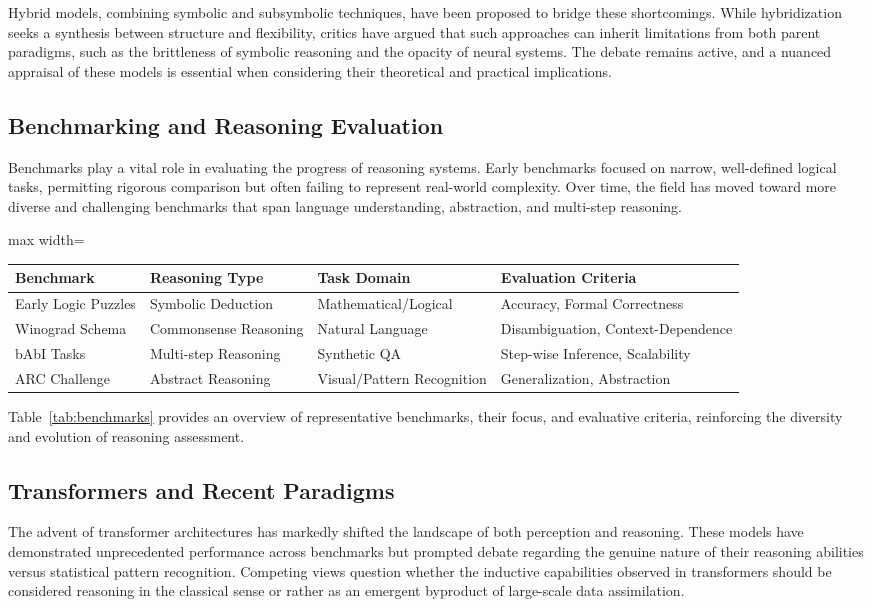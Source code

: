 \documentclass[sigconf]{acmart}
\begin{document}
Hybrid models, combining symbolic and subsymbolic techniques, have been proposed to bridge these shortcomings. While hybridization seeks a synthesis between structure and flexibility, critics have argued that such approaches can inherit limitations from both parent paradigms, such as the brittleness of symbolic reasoning and the opacity of neural systems. The debate remains active, and a nuanced appraisal of these models is essential when considering their theoretical and practical implications.

\subsection{Benchmarking and Reasoning Evaluation}
Benchmarks play a vital role in evaluating the progress of reasoning systems. Early benchmarks focused on narrow, well-defined logical tasks, permitting rigorous comparison but often failing to represent real-world complexity. Over time, the field has moved toward more diverse and challenging benchmarks that span language understanding, abstraction, and multi-step reasoning.

\begin{table*}[htbp]
\centering
\caption{Key Benchmarks in AI Reasoning and Their Evaluative Focus}
\label{tab:benchmarks}
\begin{adjustbox}{max width=\textwidth}
\begin{tabular}{@{}llll@{}}
\toprule
Benchmark & Reasoning Type & Task Domain & Evaluation Criteria \\
\midrule
Early Logic Puzzles & Symbolic Deduction & Mathematical/Logical & Accuracy, Formal Correctness \\
Winograd Schema & Commonsense Reasoning & Natural Language & Disambiguation, Context-Dependence \\
bAbI Tasks & Multi-step Reasoning & Synthetic QA & Step-wise Inference, Scalability \\
ARC Challenge & Abstract Reasoning & Visual/Pattern Recognition & Generalization, Abstraction \\
\bottomrule
\end{tabular}
\end{adjustbox}
\end{table*}

Table~\ref{tab:benchmarks} provides an overview of representative benchmarks, their focus, and evaluative criteria, reinforcing the diversity and evolution of reasoning assessment.

\subsection{Transformers and Recent Paradigms}
The advent of transformer architectures has markedly shifted the landscape of both perception and reasoning. These models have demonstrated unprecedented performance across benchmarks but prompted debate regarding the genuine nature of their reasoning abilities versus statistical pattern recognition. Competing views question whether the inductive capabilities observed in transformers should be considered reasoning in the classical sense or rather as an emergent byproduct of large-scale data assimilation.
\end{document}
